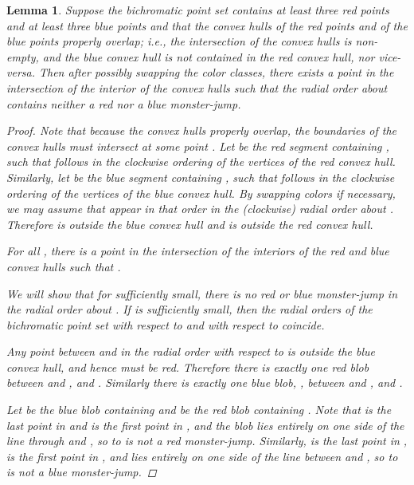 \documentclass[12pt]{article}
\newtheorem{lemma}{Lemma}
\theoremstyle{definition}
\begin{document}
\begin{lemma}
  \label{lem:no-monster-jump-overlap}
  Suppose the bichromatic point set  contains at least three red points and at least three blue points and that the convex hulls of the red points and of the blue points properly overlap; i.e., the intersection of the convex hulls is non-empty, and the blue convex hull is not contained in the red convex hull, nor vice-versa.
  Then after possibly swapping the color classes, there exists a point  in the intersection of the interior of the convex hulls such that the radial order about  contains neither a red nor a blue monster-jump.
  \begin{proof}
    Note that because the convex hulls properly overlap, the boundaries of the convex hulls must intersect at some point .
    Let  be the red segment containing , such that  follows  in the clockwise ordering of the vertices of the red convex hull.
    Similarly, let  be the blue segment containing , such that  follows  in the clockwise ordering of the vertices of the blue convex hull.
    By swapping colors if necessary, we may assume that  appear in that order in the (clockwise) radial order about .
    Therefore  is outside the blue convex hull and  is outside the red convex hull.

    For all , there is a point  in the intersection of the interiors of the red and blue convex hulls such that .

    We will show that for  sufficiently small, there is no red or blue monster-jump in the radial order about .
    If  is sufficiently small, then the radial orders of the bichromatic point set with respect to  and with respect to  coincide.
    
    Any point between  and  in the radial order with respect to  is outside the blue convex hull, and hence must be red.
    Therefore there is exactly one red blob  between  and , and .
    Similarly there is exactly one blue blob, , between  and , and .

    Let  be the blue blob containing  and  be the red blob containing .
    Note that  is the last point in  and  is the first point in , and the blob  lies entirely on one side of the line through  and , so  to  is not a red monster-jump.
    Similarly,  is the last point in ,  is the first point in , and  lies entirely on one side of the line between  and , so  to  is not a blue monster-jump.
    

\end{proof}
\end{lemma}
\end{document}
